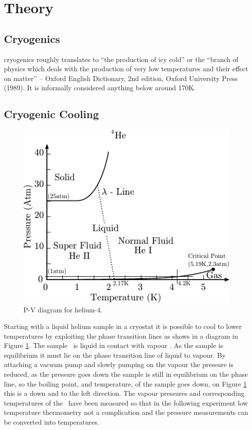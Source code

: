 \section{Theory}

\subsection{Cryogenics}
cryogenics roughly translates to ``the production of icy cold'' or the
``branch of physics which deals with the production of very low
temperatures and their effect on matter’’ -- Oxford English
Dictionary, 2nd edition, Oxford University Press (1989).
It is informally considered anything below around 170K.%

\subsection{Cryogenic Cooling}
\begin{figure}[htbp]
\centering
\includegraphics{pics/pvdiagramhe4.pdf}
\caption{P-V diagram for helium-4. \label{fig:pvdiagramhe4}}
\end{figure}
Starting with a liquid helium sample in a cryostat it is possible to cool to lower temperatures by exploiting the phase transition lines as shows in a diagram in Figure \ref{fig:pvdiagramhe4}.
The sample \he\ is liquid in contact with vapour \he. As the sample is equilibrium
it must lie on the phase transition line of liquid to vapour. By attaching a vacuum pump and
slowly pumping on the vapour the pressure is reduced, as the pressure goes down the sample is still in equilibrium on the phase line, so the boiling point, and temperature, of the sample goes down, on Figure \ref{fig:pvdiagramhe4}
this is a down and to the left direction.
The vapour pressures and corresponding temperatures of the \he\ have been measured
so that in the following experiment low temperature thermometry not a complication
and the pressure measurements can be converted into temperatures.

